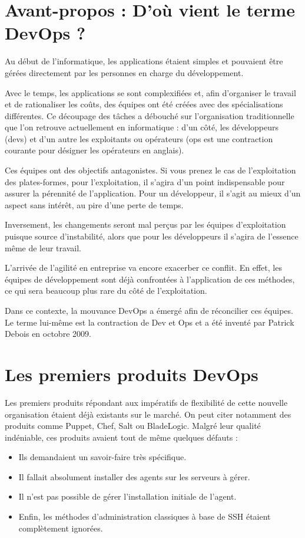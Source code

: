 \documentclass[hidelinks]{article}
\begin{document}
\section{Avant-propos : D'où vient le terme DevOps ?}
Au début de l'informatique, les applications étaient simples et pouvaient être gérées directement par les personnes en charge du développement.

Avec le temps, les applications se sont complexifiées et, afin d'organiser le travail et de rationaliser les coûts, des équipes ont été créées avec des spécialisations différentes. Ce découpage des tâches a débouché sur l'organisation traditionnelle que l'on retrouve actuellement en informatique : d'un côté, les développeurs (devs) et d'un autre les exploitants ou opérateurs (ops est une contraction courante pour désigner les opérateurs en anglais).

Ces équipes ont des objectifs antagonistes. Si vous prenez le cas de l'exploitation des plates-formes, pour l'exploitation, il s'agira d'un point indispensable pour assurer la pérennité de l'application. Pour un développeur, il s'agit au mieux d'un aspect sans intérêt, au pire d'une perte de temps.

Inversement, les changements seront mal perçus par les équipes d'exploitation puisque source d'instabilité, alors que pour les développeurs il s'agira de l'essence même de leur travail.

L'arrivée de l'agilité en entreprise va encore exacerber ce conflit. En effet, les équipes de développement sont déjà confrontées à l'application de ces méthodes, ce qui sera beaucoup plus rare du côté de l'exploitation.

Dans ce contexte, la mouvance DevOps a émergé afin de réconcilier ces équipes. Le terme lui-même est la contraction de Dev et Ops et a été inventé par Patrick Debois en octobre 2009.

\section{Les premiers produits DevOps}
Les premiers produits répondant aux impératifs de flexibilité de cette nouvelle organisation étaient déjà existants sur le marché. On peut citer notamment des produits comme Puppet, Chef, Salt ou BladeLogic. Malgré leur qualité indéniable, ces produits avaient tout de même quelques défauts :
\begin{itemize}
    \item Ils demandaient un savoir-faire très spécifique.
    \item Il fallait absolument installer des agents sur les serveurs à gérer.
    \item Il n'est pas possible de gérer l'installation initiale de l'agent.
    \item Enfin, les méthodes d'administration classiques à base de SSH étaient complètement ignorées.
\end{itemize}
\end{document}
